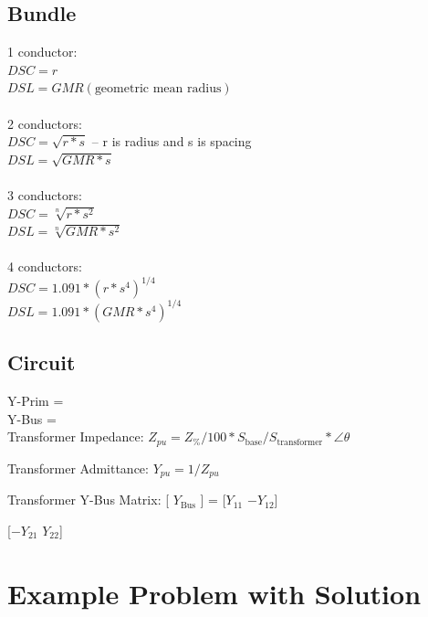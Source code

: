 \documentclass{article}
\begin{document}
	\subsection{Bundle}
	1 conductor: \\
	$DSC = r$ \\
	$DSL = GMR (\text{geometric mean radius})$ \\
	\\
	2 conductors: \\
	$DSC = \sqrt{r * s}$ -- r is radius and s is spacing \\
	$DSL = \sqrt{GMR * s}$ \\
	\\
	3 conductors: \\
	$DSC = \sqrt[n]{r * s^2}$ \\
	$DSL = \sqrt[n]{GMR * s^2}$ \\
	\\
	4 conductors: \\
	$DSC = 1.091 * (r * s^4)^{1/4}$ \\
	$DSL = 1.091 * (GMR * s^4)^{1/4}$
	
	\subsection{Circuit}
	Y-Prim = \\
	Y-Bus = \\
	
	
	
	
	
	\noindent
	Transformer Impedance: $Z_{pu} = Z_\% / 100 * S_{\text{base}} / S_{\text{transformer}} * \angle{\theta}$
	
	\noindent
	Transformer Admittance: $Y_{pu} = 1 / Z_{pu}$
	
	\noindent
	Transformer Y-Bus Matrix: [ $Y_{\text{Bus}}$ ] = [$Y_{11}$ $-Y_{12}$]
	
	\noindent
	[$-Y_{21}$ $Y_{22}$]
	
	\section{Example Problem with Solution}
	
\end{document}
